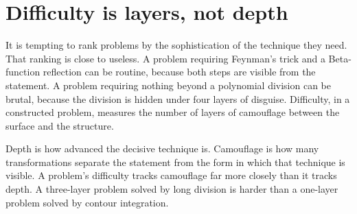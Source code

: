 \begin{center}
\end{center}

\section{Difficulty is layers, not depth}

It is tempting to rank problems by the sophistication of the technique they need. That ranking is close to useless. A problem requiring Feynman's trick and a Beta-function reflection can be routine, because both steps are visible from the statement. A problem requiring nothing beyond a polynomial division can be brutal, because the division is hidden under four layers of disguise. Difficulty, in a constructed problem, measures the number of layers of camouflage between the surface and the structure.

\begin{keynote}
Depth is how advanced the decisive technique is. Camouflage is how many transformations separate the statement from the form in which that technique is visible. A problem's difficulty tracks camouflage far more closely than it tracks depth. A three-layer problem solved by long division is harder than a one-layer problem solved by contour integration.
\end{keynote}

